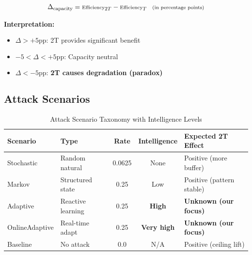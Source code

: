 \documentclass[11pt,a4paper]{article}
\newcommand{\critical}[1]{\textcolor{criticalcolor}{\textbf{#1}}}
\begin{document}
\vspace{-0.4cm}

\begin{equation}
\scriptsize
\Delta_{\text{capacity}} = \text{Efficiency}_{2T} - \text{Efficiency}_{T} \quad \text{(in percentage points)}
\end{equation}

\textbf{Interpretation:}
\begin{itemize}
\vspace{-0.2cm}
\item $\Delta > +5$pp: 2T provides significant benefit
\vspace{-0.2cm}
\item $-5 < \Delta < +5$pp: Capacity neutral
\vspace{-0.2cm}
\item $\Delta < -5$pp: \critical{2T causes degradation (paradox)}
\end{itemize}

\subsection{Attack Scenarios}

\vspace{-0.4cm}

\begin{table}[h]
\scriptsize
\centering
\begin{tabular}{llccl}
\toprule
\textbf{Scenario} & \textbf{Type} & \textbf{Rate} & \textbf{Intelligence} & \textbf{Expected 2T Effect} \\
\midrule
Stochastic & Random natural & 0.0625 & None & Positive (more buffer) \\
Markov & Structured state & 0.25 & Low & Positive (pattern stable) \\
Adaptive & Reactive learning & 0.25 & \critical{High} & \critical{Unknown (our focus)} \\
OnlineAdaptive & Real-time adapt & 0.25 & \critical{Very high} & \critical{Unknown (our focus)} \\
Baseline & No attack & 0.0 & N/A & Positive (ceiling lift) \\
\bottomrule
\end{tabular}
\vspace{-0.2cm}
\caption{Attack Scenario Taxonomy with Intelligence Levels}
\end{table}

\vspace{-0.2cm}
\end{document}
